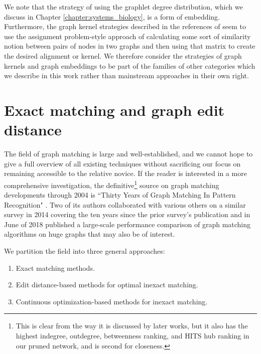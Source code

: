\documentclass[12pt]{thesis}
\theoremstyle{plain}
\theoremstyle{definition}
\theoremstyle{remark}
\begin{document}
We note that the strategy of using the graphlet degree distribution, which we discuss in Chapter \ref{chapter:systems_biology}, is a form of embedding. Furthermore, the graph kernel strategies described in the references of  \cite{Livi_2012} seem to use the assignment problem-style approach of calculating some sort of similarity notion between pairs of nodes in two graphs and then using that matrix to create the desired alignment or kernel. We therefore consider the strategies of graph kernels and graph embeddings to be part of the families of other categories which we describe in this work rather than mainstream approaches in their own right.








\section{Exact matching and graph edit distance}

The field of graph matching is large and well-established, and we cannot hope to give a full overview of all existing techniques without sacrificing our focus on remaining accessible to the relative novice. If the reader is interested in a more comprehensive investigation, the definitive\footnote{This is clear from the way it is discussed by later works, but it also has the highest indegree, outdegree, betweenness ranking, and HITS hub ranking in our pruned network, and is second for closeness.} source on graph matching developments through 2004 is ``Thirty Years of Graph Matching In Pattern Recognition" \cite{Conte_2004}. Two of its authors collaborated with various others on a similar survey in 2014 covering the ten years since the prior survey's publication \cite{foggia2014graph} and in June of 2018 published a large-scale performance comparison of graph matching algorithms on huge graphs \cite{carletti2018comparing} that may also be of interest.

We partition the field into three general approaches: 

\begin{enumerate}
\item Exact matching methods.
\item Edit distance-based methods for optimal inexact matching. 
\item Continuous optimization-based methods for inexact matching. 
\end{enumerate}
\end{document}
